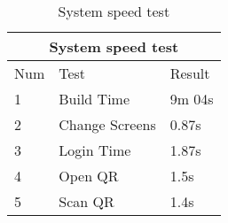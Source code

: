 \begin{table}[htp]
\centering
    \begin{tabular}{p{2cm}|p{2cm}|p{2cm}}
        \hline
        \multicolumn{3}{|c|}{System speed test} \\
        \hline
        Num & Test & Result \\
        \hline
        1 & Build Time & 9m 04s \\
        \hline
        2 & Change Screens & 0.87s \\
        \hline
        3 & Login Time & 1.87s \\
        \hline
        4 & Open QR & 1.5s \\
        \hline
        5 & Scan QR & 1.4s \\
        \hline
    \end{tabular}
    \caption{System speed test}
    \label{table:Stability}
\end{table}